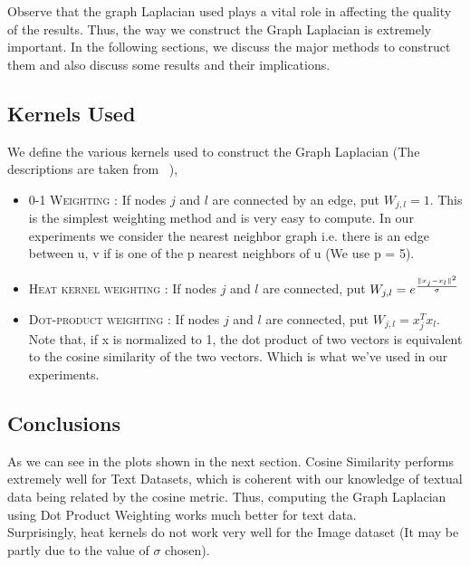 \documentclass[a4paper]{article}
\begin{document}
	Observe that the graph Laplacian used plays a vital role in affecting the quality of the results. Thus, the way we construct the Graph Laplacian is extremely important. In the following sections, we discuss the major methods to construct them and also discuss some results and their implications.
	
	\subsection{Kernels Used}

	We define the various kernels used to construct the Graph Laplacian (The descriptions are taken from ~\cite{GReg}),
	\begin{itemize}
	\item \textsc{0-1 Weighting :} If nodes $j$ and $l$ are connected by an edge, put $W_{j,l} = 1$. This is the simplest weighting method and is very easy to compute. In our experiments we consider the nearest neighbor graph i.e. there is an edge between u, v if is one of the p nearest neighbors of u (We use p = 5).
	\item \textsc{Heat kernel weighting :} If nodes $j$ and $l$ are connected, put $W_{j,l} = e^{\frac{\|x_{j}-x_{l}\|^{\text{\tiny{2}}}}{\sigma}}$
	\item \textsc{Dot-product weighting :} If nodes $j$ and $l$ are connected, put $W_{j,l} = x^{T}_{j}x_{l}$. Note that, if x is normalized to 1, the dot product of two vectors is equivalent to the cosine similarity of the two vectors. Which is what we've used in our experiments.
	
	\end{itemize}	

	\subsection{Conclusions}

	As we can see in the plots shown in the next section. Cosine Similarity performs extremely well for Text Datasets, which is coherent with our knowledge of textual data being related by the cosine metric. Thus, computing the Graph Laplacian using Dot Product Weighting works much better for text data.\\
	Surprisingly, heat kernels do not work very well for the Image dataset (It may be partly due to the value of $\sigma$ chosen).\\

	\pagebreak
	
	
\end{document}
